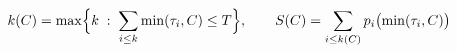 \documentclass[border=2pt]{standalone}
\begin{document}
$\displaystyle k(C)=\max\Bigl\{k\;:\;\sum_{i\le k}\min(\tau_i,C)\le T\Bigr\},\qquad S(C)=\sum_{i\le k(C)}p_i\bigl(\min(\tau_i,C)\bigr)$
\end{document}

